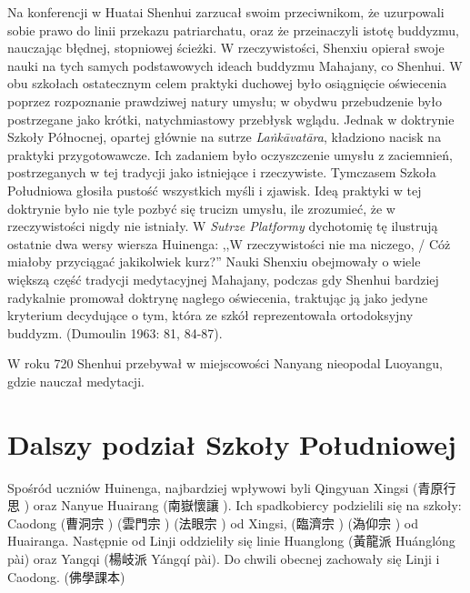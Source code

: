 Na konferencji w Huatai Shenhui zarzucał swoim przeciwnikom, że uzurpowali sobie prawo do linii przekazu patriarchatu, oraz że przeinaczyli istotę buddyzmu, nauczając błędnej, stopniowej ścieżki.
W rzeczywistości, Shenxiu opierał swoje nauki na tych samych podstawowych ideach buddyzmu Mahajany, co Shenhui.
W obu szkołach ostatecznym celem praktyki duchowej było osiągnięcie oświecenia poprzez rozpoznanie prawdziwej natury umysłu; w obydwu przebudzenie było postrzegane jako krótki, natychmiastowy przebłysk wglądu.
Jednak w doktrynie Szkoły Północnej, opartej głównie na sutrze \textit{La\.nkā\-vatāra}, kładziono nacisk na praktyki przygotowawcze.
Ich zadaniem było oczyszczenie umysłu z zaciemnień, postrzeganych w tej tradycji jako istniejące i rzeczywiste.
Tymczasem Szkoła Południowa głosiła pustość wszystkich myśli i zjawisk.
Ideą praktyki w tej doktrynie było nie tyle pozbyć się trucizn umysłu, ile zrozumieć, że w rzeczywistości nigdy nie istniały.
W \textit{Sutrze Platformy} dychotomię tę ilustrują ostatnie dwa wersy wiersza Huinenga: ,,W rzeczywistości nie ma niczego, / Cóż miałoby przyciągać jakikolwiek kurz?''
Nauki Shenxiu obejmowały o wiele większą część tradycji medytacyjnej Mahajany, podczas gdy Shenhui bardziej radykalnie promował doktrynę nagłego oświecenia, traktując ją jako jedyne kryterium decydujące o tym, która ze szkół reprezentowała ortodoksyjny buddyzm.
(Dumoulin 1963: 81, 84-87). %

W roku 720 Shenhui przebywał w miejscowości Nanyang nieopodal Luoyangu, gdzie nauczał medytacji.

\section{Dalszy podział Szkoły Południowej}
Spośród uczniów Huinenga, najbardziej wpływowi byli Qingyuan Xingsi (青原行思 ) oraz Nanyue Huairang (南嶽懷讓 ).
Ich spadkobiercy podzielili się na szkoły: Caodong (曹洞宗 ) (雲門宗 ) (法眼宗 ) od Xingsi, (臨濟宗 ) (溈仰宗 ) od Huairanga.
Następnie od Linji oddzieliły się linie Huanglong (黃龍派 Huánglóng pài) oraz Yangqi (楊岐派 Yángqí pài). Do chwili obecnej zachowały się Linji i Caodong. (佛學課本)

